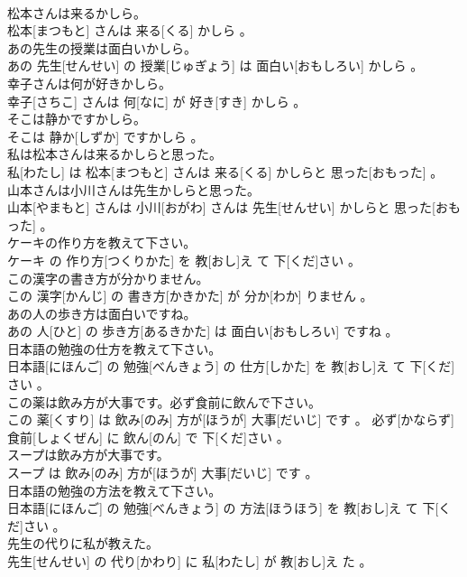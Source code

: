 \documentclass[8pt]{extreport}
\begin{document}
\begin{CJK}{UTF8}{min}
\\	松本さんは来るかしら。	
\\	松本[まつもと] さんは 来る[くる] かしら 。
\\	あの先生の授業は面白いかしら。	
\\	あの 先生[せんせい] の 授業[じゅぎょう] は 面白い[おもしろい] かしら 。
\\	幸子さんは何が好きかしら。	
\\	幸子[さちこ] さんは 何[なに] が 好き[すき] かしら 。
\\	そこは静かですかしら。	
\\	そこは 静か[しずか] ですかしら 。
\\	私は松本さんは来るかしらと思った。	
\\	私[わたし] は 松本[まつもと] さんは 来る[くる] かしらと 思った[おもった] 。
\\	山本さんは小川さんは先生かしらと思った。	
\\	山本[やまもと] さんは 小川[おがわ] さんは 先生[せんせい] かしらと 思った[おもった] 。
\\	ケーキの作り方を教えて下さい。	
\\	ケーキ の 作り方[つくりかた] を 教[おし]え て 下[くだ]さい 。
\\	この漢字の書き方が分かりません。	
\\	この 漢字[かんじ] の 書き方[かきかた] が 分か[わか] りません 。
\\	あの人の歩き方は面白いですね。	
\\	あの 人[ひと] の 歩き方[あるきかた] は 面白い[おもしろい] ですね 。
\\	日本語の勉強の仕方を教えて下さい。	
\\	日本語[にほんご] の 勉強[べんきょう] の 仕方[しかた] を 教[おし]え て 下[くだ]さい 。
\\	この薬は飲み方が大事です。必ず食前に飲んで下さい。	
\\	この 薬[くすり] は 飲み[のみ] 方が[ほうが] 大事[だいじ] です 。 必ず[かならず] 食前[しょくぜん] に 飲ん[のん] で 下[くだ]さい 。
\\	スープは飲み方が大事です。	
\\	スープ は 飲み[のみ] 方が[ほうが] 大事[だいじ] です 。
\\	日本語の勉強の方法を教えて下さい。	
\\	日本語[にほんご] の 勉強[べんきょう] の 方法[ほうほう] を 教[おし]え て 下[くだ]さい 。
\\	先生の代りに私が教えた。	
\\	先生[せんせい] の 代り[かわり] に 私[わたし] が 教[おし]え た 。

\end{CJK}
\end{document}
